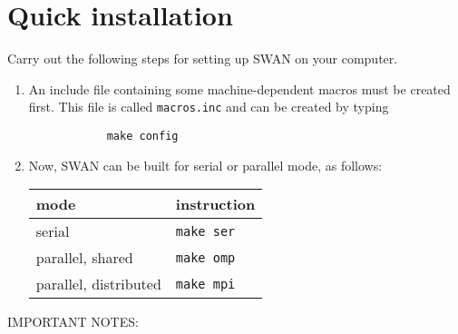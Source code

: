 \documentclass[12pt]{book}
\begin{document}
\section{Quick installation} \label{sec:quick}

Carry out the following steps for setting up SWAN on your computer.
\begin{enumerate}
  \item An include file containing some machine-dependent macros must be created first.
        This file is called {\tt macros.inc} and can be created by typing
        \begin{verbatim}
            make config
        \end{verbatim}
  \item Now, SWAN can be built for serial or parallel mode, as follows:
        \begin{table}[htb]
           \begin{center}
           \begin{tabular}{|l|l|}
              \hline
              {\bf mode}            & {\bf instruction} \\
              \hline
              serial                & {\tt make ser} \\
              \hline
              parallel, shared      & {\tt make omp} \\
              \hline
              parallel, distributed & {\tt make mpi} \\
              \hline
           \end{tabular}
           \end{center}
        \end{table}
\end{enumerate}
\newpage
\noindent
IMPORTANT NOTES:
\end{document}
